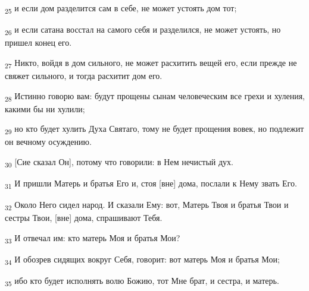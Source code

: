 \begin{tcolorbox}
\textsubscript{25} и если дом разделится сам в себе, не может устоять дом тот;
\end{tcolorbox}
\begin{tcolorbox}
\textsubscript{26} и если сатана восстал на самого себя и разделился, не может устоять, но пришел конец его.
\end{tcolorbox}
\begin{tcolorbox}
\textsubscript{27} Никто, войдя в дом сильного, не может расхитить вещей его, если прежде не свяжет сильного, и тогда расхитит дом его.
\end{tcolorbox}
\begin{tcolorbox}
\textsubscript{28} Истинно говорю вам: будут прощены сынам человеческим все грехи и хуления, какими бы ни хулили;
\end{tcolorbox}
\begin{tcolorbox}
\textsubscript{29} но кто будет хулить Духа Святаго, тому не будет прощения вовек, но подлежит он вечному осуждению.
\end{tcolorbox}
\begin{tcolorbox}
\textsubscript{30} [Сие сказал Он], потому что говорили: в Нем нечистый дух.
\end{tcolorbox}
\begin{tcolorbox}
\textsubscript{31} И пришли Матерь и братья Его и, стоя [вне] дома, послали к Нему звать Его.
\end{tcolorbox}
\begin{tcolorbox}
\textsubscript{32} Около Него сидел народ. И сказали Ему: вот, Матерь Твоя и братья Твои и сестры Твои, [вне] дома, спрашивают Тебя.
\end{tcolorbox}
\begin{tcolorbox}
\textsubscript{33} И отвечал им: кто матерь Моя и братья Мои?
\end{tcolorbox}
\begin{tcolorbox}
\textsubscript{34} И обозрев сидящих вокруг Себя, говорит: вот матерь Моя и братья Мои;
\end{tcolorbox}
\begin{tcolorbox}
\textsubscript{35} ибо кто будет исполнять волю Божию, тот Мне брат, и сестра, и матерь.
\end{tcolorbox}

